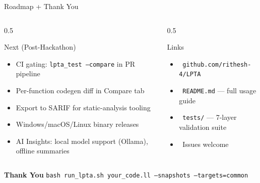 \documentclass[aspectratio=169]{beamer}
\begin{document}
\begin{frame}{Roadmap + Thank You}
  \begin{columns}[T,onlytextwidth]
    \begin{column}{0.5\textwidth}
      \begin{block}{Next (Post-Hackathon)}
        \begin{itemize}
          \item CI gating: \texttt{lpta\_test --compare} in PR pipeline
          \item Per-function codegen diff in Compare tab
          \item Export to SARIF for static-analysis tooling
          \item Windows/macOS/Linux binary releases
          \item AI Insights: local model support (Ollama), offline summaries
        \end{itemize}
      \end{block}
    \end{column}
    \begin{column}{0.5\textwidth}
      \begin{block}{Links}
        \begin{itemize}
          \item \faGithub\ \texttt{github.com/rithesh-4/LPTA}
          \item \faFileCode\ \texttt{README.md} — full usage guide
          \item \faFlask\ \texttt{tests/} — 7-layer validation suite
          \item \faQuestionCircle\ Issues welcome
        \end{itemize}
      \end{block}
    \end{column}
  \end{columns}
  \vspace{1em}
  \centering
  \Large \textbf{Thank You}
  \vspace{0.5em}
  \normalsize \texttt{bash run\_lpta.sh your\_code.ll --snapshots --targets=common}
\end{frame}
\end{document}

